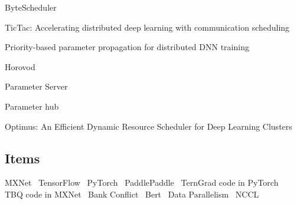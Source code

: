 ByteScheduler~\cite{peng2019bytescheduler}

TicTac: Accelerating distributed deep learning with communication scheduling~\cite{hashemi2018tictac}

Priority-based parameter propagation for distributed DNN training~\cite{jayarajan2019priority}

Horovod~\cite{horovod}

Parameter Server~\cite{li2013parameter}

Parameter hub~\cite{luo2018parameter}

Optimus: An Efficient Dynamic Resource Scheduler for Deep Learning Clusters~\cite{Peng2018Optimus}

\subsection{Items}

MXNet~\cite{chen2015mxnet, MXNetWebsite}
TensorFlow~\cite{Tensorflow}
PyTorch~\cite{Pytorch}
PaddlePaddle~\cite{paddlepaddlecode}
TernGrad code in PyTorch~\cite{open-source-Terngrad}
TBQ code in MXNet~\cite{open-source-TBQ}
Bank Conflict~\cite{bank-conflicts-in-GPU}
Bert~\cite{devlin2018bert}
Data Parallelism~\cite{dean2012large}
NCCL~\cite{NCCL}
